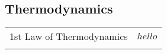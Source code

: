 \documentclass[a4paper, landscape]{article}
\begin{document}
\begin{multicols}{2}

\section*{Thermodynamics}
\begin{tabular}{l l}
    1st Law of Thermodynamics & $hello$  \\
     & 
\end{tabular}

\end{multicols}
\end{document}
